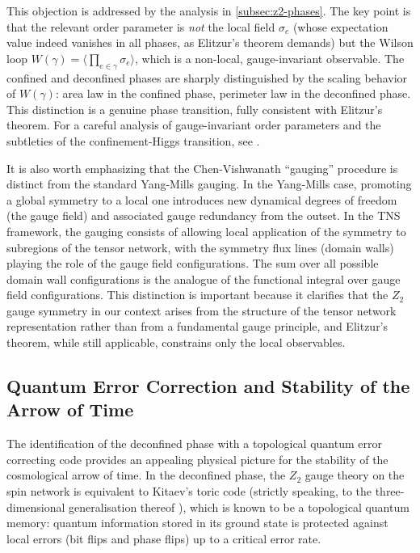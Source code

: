 \documentclass[preprint]{SciPost}
\newcommand{\expect}[1]{\langle #1\rangle}
\theoremstyle{plain} %
\begin{document}
This objection is addressed by the analysis in \autoref{subsec:z2-phases}. The key point is that the relevant order parameter is \emph{not} the local field $ \sigma_e $ (whose expectation value indeed vanishes in all phases, as Elitzur's theorem demands) but the Wilson loop $ W(\gamma) = \expect{\prod_{e \in \gamma} \sigma_e} $, which is a non-local, gauge-invariant observable. The confined and deconfined phases are sharply distinguished by the scaling behavior of $ W(\gamma) $: area law in the confined phase, perimeter law in the deconfined phase. This distinction is a genuine phase transition, fully consistent with Elitzur's theorem. For a careful analysis of gauge-invariant order parameters and the subtleties of the confinement-Higgs transition, see \cite{Greensite2020The-Higgs}.

It is also worth emphasizing that the Chen-Vishwanath ``gauging'' procedure is distinct from the standard Yang-Mills gauging. In the Yang-Mills case, promoting a global symmetry to a local one introduces new dynamical degrees of freedom (the gauge field) and associated gauge redundancy from the outset. In the TNS framework, the gauging consists of allowing local application of the symmetry to subregions of the tensor network, with the symmetry flux lines (domain walls) playing the role of the gauge field configurations. The sum over all possible domain wall configurations is the analogue of the functional integral over gauge field configurations. This distinction is important because it clarifies that the $ Z_2 $ gauge symmetry in our context arises from the structure of the tensor network representation rather than from a fundamental gauge principle, and Elitzur's theorem, while still applicable, constrains only the local observables.

\subsection{Quantum Error Correction and Stability of the Arrow of Time}

The identification of the deconfined phase with a topological quantum error correcting code \cite{Dennis2002Topological,Mildenberger2024Probing,Homeier2023Quantum,Jahn2021Holographic,Steinberg2023Holographic} provides an appealing physical picture for the stability of the cosmological arrow of time. In the deconfined phase, the $ Z_2 $ gauge theory on the spin network is equivalent to Kitaev's toric code (strictly speaking, to the three-dimensional generalisation thereof \cite{Dennis2002Topological}), which is known to be a topological quantum memory: quantum information stored in its ground state is protected against local errors (bit flips and phase flips) up to a critical error rate.
\end{document}
